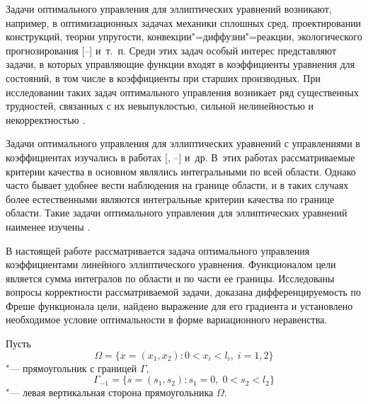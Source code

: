 \date{}

\renewcommand{\JournalDataOnline}{\displaydate{tage}}


\makerutitle

\newpage


 Задачи оптимального управления для эллиптических 
уравнений возникают, например, в оптимизационных задачах механики сплошных 
сред, проектировании конструкций, теории упругости, 
конвекции"=диффузии"=реакции, экологического прогнозирования [--] и~т.~п. 
Среди этих задач особый интерес представляют задачи, в которых управляющие 
функции входят в коэффициенты уравнения для состояний, в том числе в 
коэффициенты при старших производных. При исследовании таких задач 
оптимального управления возникает ряд существенных трудностей, связанных с 
их невыпуклостью, сильной нелинейностью и некорректностью \cite{tagiev:bib4,tagiev:bib5}.

Задачи оптимального управления для эллиптических уравнений с управлениями в 
коэффициентах изучались в работах [, --] и~др.
В~этих работах 
рассматриваемые критерии качества в основном являлись интегральными по всей 
области. Однако часто бывает удобнее вести наблюдения на границе области, и в 
таких случаях более естественными являются интегральные критерии качества по 
границе области. Такие задачи оптимального управления для эллиптических 
уравнений наименее изучены \cite{tagiev:bib4,tagiev:bib14}. 

В настоящей работе рассматривается задача оптимального управления 
коэффициентами линейного эллиптического уравнения. Функционалом цели является 
сумма интегралов по области и по части ее границы. Исследованы вопросы 
корректности рассматриваемой задачи, доказана дифференцируемость по Фреше 
функционала цели, найдено выражение для его градиента и установлено 
необходимое условие оптимальности в форме вариационного неравенства.

\smallskip

Пусть $$\Omega =\bigl\{ x= (x_1, x_2 ): 0<x_i < l _i , \; i=1, 2 \bigr\}$$ "--- прямоугольник с границей $\Gamma$, $$\Gamma _{-1} =\bigl\{ s= (s_1,s_2 ):s_1 =0, \; 0<s_2 < l _2 \bigr\}$$ "--- левая вертикальная сторона прямоугольника $\Omega$.


